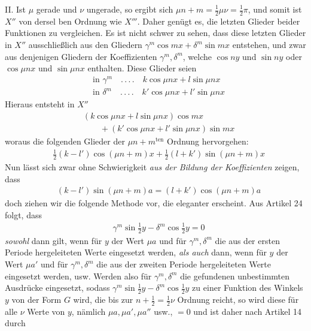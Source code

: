 II. Ist $\mu$ gerade und $\nu$ ungerade, so ergibt sich $\mu n+m=\tfrac12\mu\nu=\tfrac12\pi$, und somit ist $X''$ von dersel%
ben Ordnung wie $X'''$. Daher genügt es, die letzten Glieder beider Funktionen zu vergleichen. Es ist nicht schwer zu sehen, dass diese letzten Glieder in $X''$ ausschließlich aus den Gliedern $\gamma^m\cos mx+\delta^m\sin mx$ entstehen, und zwar aus denjenigen Gliedern der Koeffizienten $\gamma^m,\delta^m$, welche $\cos ny$ und $\sin ny$ oder $\cos\mu nx$ und $\sin\mu nx$ enthalten. Diese Glieder seien
\[
\begin{aligned}
&\text{in }\gamma^m\quad.\,.\,.\,.\quad k\cos\mu nx+l\sin\mu nx\\[5pt]
&\text{in }\delta^m\quad.\,.\,.\,.\quad k'\cos\mu nx+l'\sin\mu nx
\end{aligned}
\]
Hieraus entsteht in $X''$
\[
\begin{aligned}
&(k\cos\mu nx+l\sin\mu nx)\cos mx\\[5pt]
&\qquad{}+(k'\cos\mu nx+l'\sin\mu nx)\sin mx
\end{aligned}
\]
woraus die folgenden Glieder der $\mu n+m^{\mathrm{ten}}$ Ordnung hervorgehen:
\[
\begin{aligned}
&\tfrac12(k-l')\cos(\mu n+m)x+\tfrac12(l+k')\sin(\mu n+m)x
\end{aligned}
\]
Nun lässt sich zwar ohne Schwierigkeit \textit{aus der Bildung der Koeffizienten} zeigen, dass
\[
\begin{aligned}
&(k-l')\sin(\mu n+m)a=(l+k')\cos(\mu n+m)a
\end{aligned}
\]
doch ziehen wir die folgende Methode vor, die eleganter erscheint. Aus Artikel 24 folgt, dass
\[
\begin{aligned}
&\gamma^m\sin\tfrac12y-\delta^m\cos\tfrac12y=0
\end{aligned}
\]
\textit{sowohl} dann gilt, wenn für $y$ der Wert $\mu a$ und für $\gamma^m,\delta^m$ die aus der ersten Periode hergeleiteten Werte eingesetzt werden,
\textit{als auch} dann, wenn für $y$ der Wert $\mu a'$ und für $\gamma^m,\delta^m$ die aus der zweiten Periode hergeleiteten Werte eingesetzt werden, usw. Werden also für $\gamma^m,\delta^m$ die gefundenen unbestimmten Ausdrücke eingesetzt, sodass $\gamma^m\sin\tfrac12y-\delta^m\cos\tfrac12y$ zu einer Funktion des Winkels $y$ von der Form $G$ wird, die bis zur $n+\tfrac12=\tfrac12\nu$ Ordnung reicht, so wird diese für alle $\nu$ Werte von $y$, nämlich $\mu a,\mu a',\mu a''$ usw., $=0$ und ist daher nach Artikel 14 durch
